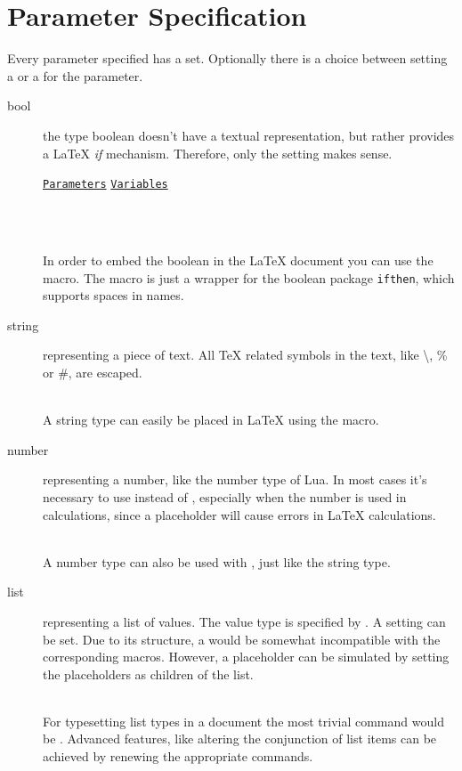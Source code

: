 \documentclass{ltxdoc}
\newcommand\showexample[5][15pt]{%
\begin{minipage}[t]{.5\linewidth - .5 \columnsep}%

\end{minipage}\hspace*{\columnsep}%
\begin{minipage}[t]{.5\linewidth - .5 \columnsep}%

\end{minipage}\\%
}
\begin{document}
    \section{Parameter Specification}
    Every parameter specified has a  set.
    Optionally there is a choice between setting a  or a  for the parameter.
    \begin{description}
        \item[bool] the type boolean doesn't have a textual representation, but rather provides a \LaTeX{} \textit{if} mechanism.
        Therefore, only the  setting makes sense.\\[5pt]
        \hspace*{5pt}\parbox{\linewidth-5pt}{%
            \hfill\href{example/example-specification.yaml}{\texttt{Parameters}}\hfill\hspace*{\columnsep}%
            \hfill\href{example/example.yaml}{\texttt{Variables}}\hfill\hspace*{\columnsep}}\\%
        \showexample{1}{1-3}{1}{1-1}
        \DescribeMacro{\ifparam}
        In order to embed the boolean in the \LaTeX{} document you can use the \cmd{\ifparam} macro.
        The macro is just a wrapper for the boolean package \texttt{ifthen}, which supports spaces in names.
        \item[string] representing a piece of text.
        All \TeX{} related symbols in the text, like \textbackslash, \% or \#, are escaped.\\
        \showexample{4}{4-6}{2}{2-2}
        \DescribeMacro{\param} A string type can easily be placed in \LaTeX{} using the \cmd{\param} macro.
        \item[number] representing a number, like the number type of Lua.
        In most cases it's necessary to use  instead of , especially when the number is used in calculations, since a placeholder will cause errors in \LaTeX{} calculations.\\
        \showexample{7}{7-9}{3}{3-3}
        A number type can also be used with \cmd{\param}, just like the string type.
        \item[list] representing a list of values.
        The value type is specified by .
        A  setting can be set.
        Due to its structure, a  would be somewhat incompatible with the corresponding macros.
        However, a placeholder can be simulated by setting the placeholders as children of the  list.\\
        \showexample{10}{10-15}{4}{4-6}
        \DescribeMacro{\doparamlist} For typesetting list types in a document the most trivial command would be \cmd{\doparamlist}.
        Advanced features, like altering the conjunction of list items can be achieved by renewing the appropriate commands.
        \DescribeMacro{\paramlist@conjunction}


\end{description}
\end{document}
